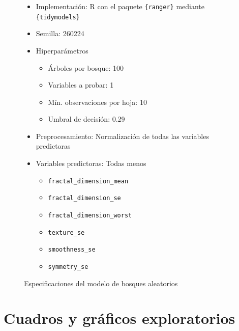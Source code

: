 \documentclass[a4paper, titlepage]{article}
\begin{document}
\begin{figure}[h]
  \renewcommand{\figurename}{Cuadro}
\begin{framed}
\begin{itemize}
  \item Implementación: R con el paquete \verb|{ranger}| mediante \verb|{tidymodels}|
  \item Semilla: 260224
  \item Hiperparámetros
  \begin{itemize}
    \item Árboles por bosque: 100
    \item Variables a probar: 1
    \item Mín. observaciones por hoja: 10
    \item Umbral de decisión: 0.29
  \end{itemize}
  \item Preprocesamiento: Normalización de todas las variables predictoras
  \item Variables predictoras: Todas menos
  \begin{itemize}
    \item \verb|fractal_dimension_mean|
    \item \verb|fractal_dimension_se|
    \item \verb|fractal_dimension_worst|
    \item \verb|texture_se|
    \item \verb|smoothness_se|
    \item \verb|symmetry_se|
  \end{itemize}
\end{itemize}
\end{framed}
\caption{Especificaciones del modelo de bosques aleatorios}
\label{fig:rfespec}
\end{figure}

\clearpage

\section{Cuadros y gráficos exploratorios}\label{sec:anexo2}

\begin{table}[h]

  \caption{Estadísticos descriptivos de las variables según sufijo (\textit{\_mean, \_se, \_worst}) y características de las células}
\label{tab:resumen}
\end{table}
\end{document}
